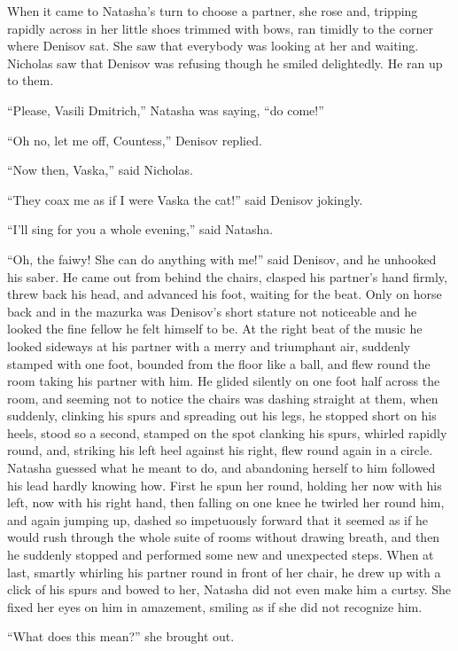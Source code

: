 When it came to Natasha's turn to choose a partner, she rose and,
tripping rapidly across in her little shoes trimmed with bows,
ran timidly to the corner where Denisov sat. She saw that
everybody was looking at her and waiting. Nicholas saw that
Denisov was refusing though he smiled delightedly. He ran up to
them.

``Please, Vasili Dmitrich,'' Natasha was saying, ``do come!''

``Oh no, let me off, Countess,'' Denisov replied.

``Now then, Vaska,'' said Nicholas.

``They coax me as if I were Vaska the cat!'' said Denisov
jokingly.

``I'll sing for you a whole evening,'' said Natasha.

``Oh, the faiwy! She can do anything with me!'' said Denisov, and
he unhooked his saber. He came out from behind the chairs,
clasped his partner's hand firmly, threw back his head, and
advanced his foot, waiting for the beat. Only on horse back and
in the mazurka was Denisov's short stature not noticeable and he
looked the fine fellow he felt himself to be. At the right beat
of the music he looked sideways at his partner with a merry and
triumphant air, suddenly stamped with one foot, bounded from the
floor like a ball, and flew round the room taking his partner
with him. He glided silently on one foot half across the room,
and seeming not to notice the chairs was dashing straight at
them, when suddenly, clinking his spurs and spreading out his
legs, he stopped short on his heels, stood so a second, stamped
on the spot clanking his spurs, whirled rapidly round, and,
striking his left heel against his right, flew round again in a
circle. Natasha guessed what he meant to do, and abandoning
herself to him followed his lead hardly knowing how.  First he
spun her round, holding her now with his left, now with his right
hand, then falling on one knee he twirled her round him, and
again jumping up, dashed so impetuously forward that it seemed as
if he would rush through the whole suite of rooms without drawing
breath, and then he suddenly stopped and performed some new and
unexpected steps. When at last, smartly whirling his partner
round in front of her chair, he drew up with a click of his spurs
and bowed to her, Natasha did not even make him a curtsy. She
fixed her eyes on him in amazement, smiling as if she did not
recognize him.

``What does this mean?'' she brought out.

